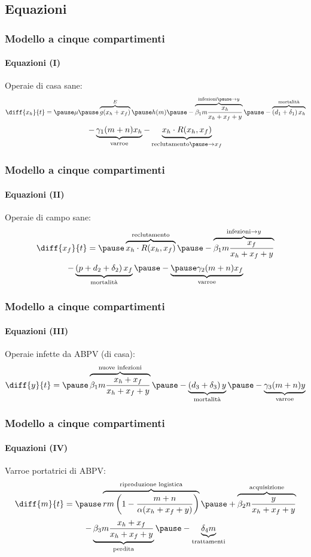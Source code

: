 \documentclass[]{beamer}
\begin{document}
\subsection{Equazioni}

\begin{frame}
    \frametitle{Modello a cinque compartimenti}
    \framesubtitle{Equazioni (I)}

    Operaie di casa sane:
    $$ \diff{x_h}{t} = \pause \mu \pause \overbrace{ g( x_h + x_f ) }^{E} %
        \pause h(m) \pause - \overbrace{ \beta_1 m \frac{x_h}{x_h + x_f + y} }^{\text{infezioni} \pause \to y} %
        \pause - \overbrace{ \left( d_1 + \delta_1 \right) x_h }^{\text{mortalità}} $$
    \pause
    $$ - \underbrace{ \gamma_1 (m+n) x_h }_{\text{varroe}} %
        - \underbrace{ x_h \cdot R(x_h, x_f) }_{\text{reclutamento} \pause \to x_f}  $$
\end{frame}

\begin{frame}
    \frametitle{Modello a cinque compartimenti}
    \framesubtitle{Equazioni (II)}

    Operaie di campo sane:
    $$ \diff{x_f}{t} = \pause \overbrace{ x_h \cdot R(x_h, x_f) }^{\text{reclutamento}} %
    \pause - \overbrace{ \beta_1 m \frac{x_f}{x_h + x_f + y} }^{\text{infezioni} \to y}$$
    \pause
    $$ - \underbrace{\left( p + d_2 + \delta_2 \right) x_f}_{\text{mortalità}} %
    \pause - \underbrace{ \pause \gamma_2 (m+n) x_f }_{\text{varroe}}$$
\end{frame}

\begin{frame}
    \frametitle{Modello a cinque compartimenti}
    \framesubtitle{Equazioni (III)}

    Operaie infette da ABPV (di casa):
    $$\diff{y}{t} = \pause \overbrace{ \beta_1 m \frac{x_h + x_f}{x_h + x_f + y} }^{\text{nuove infezioni}} %
    \pause - \underbrace{ \left( d_3 + \delta_3 \right) y }_{\text{mortalità}} %
    \pause - \underbrace{ \gamma_3 (m+n) y }_{\text{varroe}}$$
\end{frame}

\begin{frame}
    \frametitle{Modello a cinque compartimenti}
    \framesubtitle{Equazioni (IV)}

    Varroe portatrici di ABPV:
    $$\diff{m}{t} = \pause \overbrace{ rm \left( 1 - \frac{m+n}{ \alpha (x_h + x_f + y) } \right) %
        }^{\text{riproduzione logistica}}%
        \pause + \overbrace{ \beta_2 n \frac{y}{x_h + x_f + y} }^{\text{acquisizione}}$$
    \pause
    $$- \underbrace{ \beta_3 m \frac{x_h + x_f}{x_h + x_f + y} }_{\text{perdita}} %
        \pause -\underbrace{ \delta_4 m }_{\text{trattamenti}} $$
\end{frame}
\end{document}
